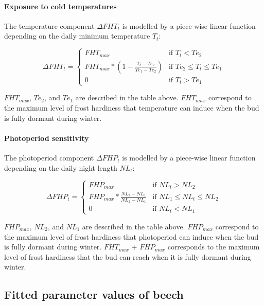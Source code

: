 \paragraph{Exposure to cold temperatures}

The temperature component $\Delta FHT_t$ is modelled by a piece-wise linear function depending on the daily minimum temperature $T_t$:

\begin{equation}
  \Delta FHT_t =
    \begin{cases}
      FHT_{max} & \text{if $T_t < Te_2$}\\
      FHT_{max}*(1-\frac{T_t-Te_2}{Te_1-Te_2}) & \text{if $Te_2 \leq T_t \leq Te_1$}\\
      0 & \text{if $T_t > Te_1$}
    \end{cases}       
\end{equation}

\noindent $FHT_{max}$, $Te_2$, and $Te_1$ are described in the table above. $FHT_{max}$ correspond to the maximum level of frost hardiness that temperature can induce when the bud is fully dormant during winter.

\paragraph{Photoperiod sensitivity}

The photoperiod component $\Delta FHP_t$ is modelled by a piece-wise linear function depending on the daily night length $NL_t$:

\begin{equation}
  \Delta FHP_t =
    \begin{cases}
      FHP_{max} & \text{if $NL_t > NL_2$}\\
      FHP_{max}*\frac{NL_t-NL_1}{NL_2-NL_1} & \text{if $NL_1 \leq NL_t \leq NL_2$}\\
      0 & \text{if $NL_t < NL_1$}
    \end{cases}       
\end{equation}

\noindent $FHP_{max}$, $NL_2$, and $NL_1$ are described in the table above. $FHP_{max}$ correspond to the maximum level of frost hardiness that photoperiod can induce when the bud is fully dormant during winter. $FHT_{max}$ + $FHP_{max}$ corresponds to the maximum level of frost hardiness that the bud can reach when it is fully dormant during winter. 

\newpage

\subsection{Fitted parameter values of beech}

